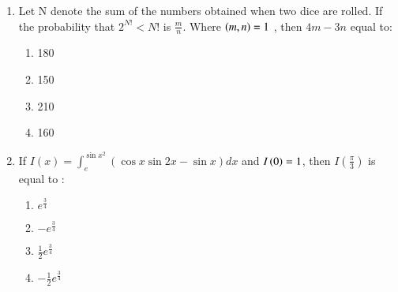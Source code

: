 \documentclass[journal]{IEEEtran}
\begin{document}
\begin{enumerate}
    \item Let N denote the sum of the numbers obtained when two dice are rolled. If the probability that $2^{N!} < N!$ is $\frac{m}{n}$. Where $\left(m,n\right)=1$ , then $4m-3n$ equal to:
    \begin{multicols}{4}
            \begin{enumerate}
              \item 180
              \item 150
              \item 210
              \item 160
            \end{enumerate}
        \end{multicols}
        \item If $I(x)=\int_ e^{\sin{x}^2} (\cos{x}\sin{2x}-\sin{x}) dx$ and $I\left(0\right)=1$, then $I(\frac{\pi}{3})$ is equal to :
        \begin{multicols}{4}
            \begin{enumerate}
              \item $e^{\frac{3}{4}}$
              \item $-e^{\frac{3}{4}}$
            \item $\frac{1}{2}e^{\frac{3}{4}}$
              \item $-\frac{1}{2}e^{\frac{3}{4}}$
            \end{enumerate}
        \end{multicols}
 \end{enumerate}
\end{document}
